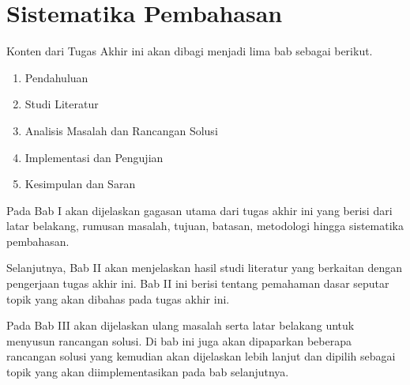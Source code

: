 \section{Sistematika Pembahasan}

Konten dari Tugas Akhir ini akan dibagi menjadi lima bab sebagai berikut.
\begin{enumerate}
    \item Pendahuluan
    \item Studi Literatur
    \item Analisis Masalah dan Rancangan Solusi
    \item Implementasi dan Pengujian
    \item Kesimpulan dan Saran
\end{enumerate}

Pada Bab I akan dijelaskan gagasan utama dari tugas akhir ini yang berisi dari latar belakang, rumusan masalah, tujuan, batasan, metodologi hingga sistematika pembahasan.

Selanjutnya, Bab II akan menjelaskan hasil studi literatur yang berkaitan dengan pengerjaan tugas akhir ini. Bab II ini berisi tentang pemahaman dasar seputar topik yang akan dibahas pada tugas akhir ini.

Pada Bab III akan dijelaskan ulang masalah serta latar belakang untuk menyusun rancangan solusi. Di bab ini juga akan dipaparkan beberapa rancangan solusi yang kemudian akan dijelaskan lebih lanjut dan dipilih sebagai topik yang akan diimplementasikan pada bab selanjutnya.


